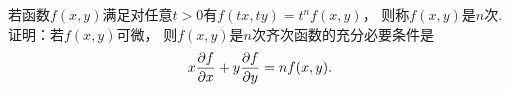 \begin{example}
若函数\(f(x,y)\)满足对任意\(t>0\)有\(f(tx,ty)=t^n f(x,y)\)，
则称\(f(x,y)\)是\(n\)次.
证明：若\(f(x,y)\)可微，
则\(f(x,y)\)是\(n\)次齐次函数的充分必要条件是\[
	x \pdv{f}{x} + y \pdv{f}{y} = n f(x,y).
\]

\end{example}

